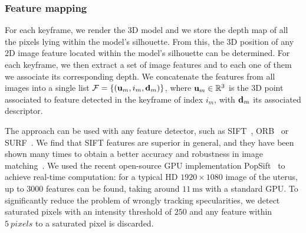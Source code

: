 \subsubsection{Feature mapping}
\label{sec:preparing}
For each keyframe, we render the 3D model and we store the depth map of all the pixels lying within the model's silhouette. %
From this, the 3D position  of any 2D image feature located within the model's silhouette can be determined.
For each keyframe, we then extract a set of image features and to each one of them we associate its corresponding depth. 
We concatenate the features from all images into a single list $\mathcal{F}=\{(\mathbf{u}_{m},i_{m},\mathbf{d}_{m})\}$, where $\mathbf{u}_{m} \in \mathbb{R}^3$
is the 3D point associated to feature detected in the keyframe of index $i_{m}$, with $\mathbf{d}_{m}$ its associated descriptor.

The approach can be used with any feature detector, such as SIFT~\cite{Lowe:2004:DIF:993451.996342}, ORB~\cite{orbslam_laparo} or SURF~\cite{SURF}. We find that SIFT features are superior in general, and they have been shown many times to obtain a better accuracy and robustness in image matching~\cite{Tuytelaars2007}. We used the recent open-source GPU implementation PopSift~\cite{Griwodz2018Popsift} to achieve real-time computation: for a typical HD $1920\times1080$ image of the uterus, up to $3000$ features can be found, taking around $\SI{11}{\milli\second}$ with a standard GPU.
To significantly reduce the problem of wrongly tracking specularities, we detect saturated pixels with an intensity threshold of $250$ and any feature within $\SI{5}{pixels}$ to a saturated pixel is discarded.  

